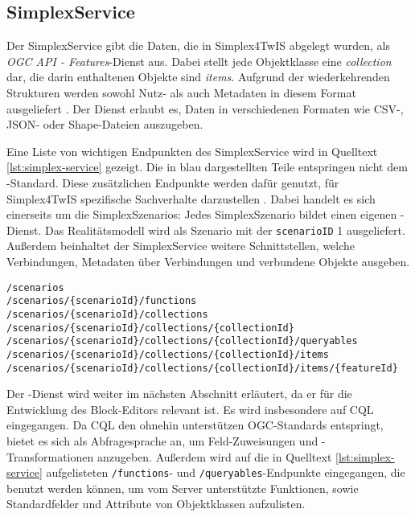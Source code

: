 \subsection{SimplexService}
\label{sec:simplex-service}

Der SimplexService gibt die Daten, die in Simplex4TwIS abgelegt wurden, als \textit{OGC API - Features}-Dienst aus. Dabei stellt jede Objektklasse eine \textit{collection} dar, die darin enthaltenen Objekte sind \textit{items}. Aufgrund der wiederkehrenden Strukturen werden sowohl Nutz- als auch Metadaten in diesem Format ausgeliefert \parencite{grossmannEnvVisioService2022}. Der Dienst erlaubt es, Daten in verschiedenen Formaten wie \acs{CSV}-, \acs{JSON}- oder Shape-Dateien auszugeben.

Eine Liste von wichtigen Endpunkten des SimplexService wird in Quelltext \ref{lst:simplex-service} gezeigt. Die in blau dargestellten Teile entspringen nicht dem \ogcapi-Standard. Diese zusätzlichen Endpunkte werden dafür genutzt, für Simplex4TwIS spezifische Sachverhalte darzustellen \parencite{grossmannEnvVisioService2022}. Dabei handelt es sich einerseits um die SimplexSzenarios: Jedes SimplexSzenario bildet einen eigenen \ogcapi-Dienst. Das Realitätsmodell wird als Szenario mit der \texttt{scenarioID} 1 ausgeliefert. Außerdem beinhaltet der SimplexService weitere Schnittstellen, welche Verbindungen, Metadaten über Verbindungen und verbundene Objekte ausgeben.

\begin{lstlisting}[float=!ht,language=simplexservice,caption={[Ausgewählte Endpunkte des SimplexService]Ausgewählte Endpunkte des SimplexService. Schwarz dargestellte Abschnitte sind Teil des \ogcapi-Standard, während die blauen Teile vom SimplexService hinzugefügt wurden. \\\parencite{simplex4datagmbhSimplexServiceDokumenation}},label=lst:simplex-service]
/scenarios
/scenarios/{scenarioId}/functions
/scenarios/{scenarioId}/collections
/scenarios/{scenarioId}/collections/{collectionId}
/scenarios/{scenarioId}/collections/{collectionId}/queryables
/scenarios/{scenarioId}/collections/{collectionId}/items
/scenarios/{scenarioId}/collections/{collectionId}/items/{featureId}
\end{lstlisting}

Der \ogcapi-Dienst wird weiter im nächsten Abschnitt erläutert, da er für die Entwicklung des Block-Editors relevant ist. Es wird insbesondere auf \ac{CQL} eingegangen. Da \ac{CQL} den ohnehin unterstützen \ac{OGC}-Standards entspringt, bietet es sich als Abfragesprache an, um Feld-Zuweisungen und -Transformationen anzugeben. Außerdem wird auf die in Quelltext \ref{lst:simplex-service} aufgelisteten \texttt{/functions}- und \texttt{/queryables}-Endpunkte eingegangen, die benutzt werden können, um vom Server unterstützte Funktionen, sowie Standardfelder und Attribute von Objektklassen aufzulisten.
